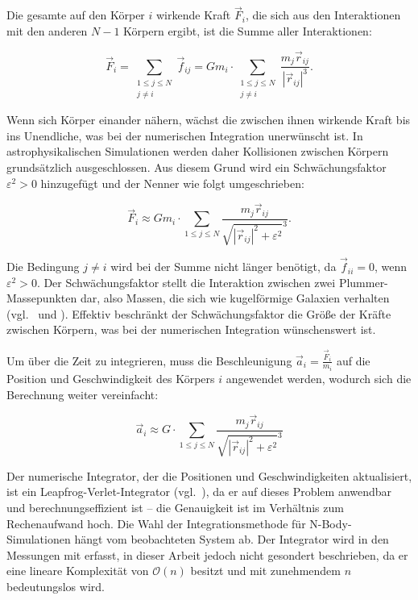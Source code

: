 Die gesamte auf den Körper $i$ wirkende Kraft $\vec{F}_i$, die sich aus den
Interaktionen mit den anderen $N - 1$ Körpern ergibt, ist die Summe aller
Interaktionen:

\[
    \vec{F}_i = \sum\limits_{\substack{1 \leq j \leq N\\ j \neq i}} \vec{f}_{ij}
              = G m_i \cdot \sum\limits_{\substack{1 \leq j \leq N\\j \neq i}}
                \frac{m_j \vec{r}_{ij}}{|\vec{r}_{ij}|^3}.
\]

Wenn sich Körper einander nähern, wächst die zwischen ihnen wirkende Kraft bis
ins Unendliche, was bei der numerischen Integration unerwünscht ist. In
astrophysikalischen Simulationen werden daher Kollisionen zwischen Körpern
grundsätzlich ausgeschlossen. Aus diesem Grund wird ein Schwächungsfaktor
$\varepsilon^2 > 0$ hinzugefügt und der Nenner wie folgt umgeschrieben:

\[
    \vec{F}_i \approx G m_i \cdot \sum\limits_{1 \leq j \leq N}
                      \frac{m_j \vec{r}_{ij}}
                           {\sqrt{|\vec{r}_{ij}|^2 + \varepsilon^2}^3}.
\]

Die Bedingung $j \neq i$ wird bei der Summe nicht länger benötigt, da
$\vec{f}_{ii} = 0$, wenn $\varepsilon^2 > 0$. Der Schwächungsfaktor stellt die
Interaktion zwischen zwei Plummer-Massepunkten dar, also Massen, die sich wie
kugelförmige Galaxien verhalten (vgl.~\cite{aarseth2003} und \cite{dyer1993}).
Effektiv beschränkt der Schwächungsfaktor die Größe der Kräfte zwischen Körpern,
was bei der numerischen Integration wünschenswert ist.

Um über die Zeit zu integrieren, muss die Beschleunigung
$\vec{a}_i = \frac{\vec{F}_i}{m_i}$ auf die Position und Geschwindigkeit des
Körpers $i$ angewendet werden, wodurch sich die Berechnung weiter vereinfacht:

\[
    \vec{a}_i \approx G \cdot \sum\limits_{1 \leq j \leq N}
                      \frac{m_j \vec{r}_{ij}}
                           {\sqrt{|\vec{r}_{ij}|^2 + \varepsilon^2}^3}
\]

Der numerische Integrator, der die Positionen und Geschwindigkeiten
aktualisiert, ist ein Leapfrog-Verlet-Integrator (vgl.~\cite{verlet1967}), da er
auf dieses Problem anwendbar und berechnungseffizient ist -- die Genauigkeit
ist im Verhältnis zum Rechenaufwand hoch. Die Wahl der Integrationsmethode für
N-Body-Simulationen hängt vom beobachteten System ab. Der Integrator wird in
den Messungen mit erfasst, in dieser Arbeit jedoch nicht gesondert beschrieben,
da er eine lineare Komplexität von $\mathcal{O}(n)$ besitzt und mit zunehmendem
$n$ bedeutungslos wird.

